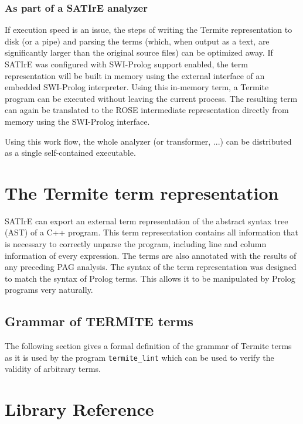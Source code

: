 \documentclass[10pt,twoside]{scrreprt}
\begin{document}
\subsection{As part of a SATIrE analyzer}

If execution speed is an issue, the steps of writing the Termite
representation to disk (or a pipe) and parsing the terms (which, when
output as a text, are significantly larger than the original source
files) can be optimized away. If SATIrE was configured with SWI-Prolog
support enabled, the term representation will be built in memory using
the external interface of an embedded SWI-Prolog interpreter. Using
this in-memory term, a Termite program can be executed without leaving
the current process. The resulting term can again be translated to the
ROSE intermediate representation directly from memory using the
SWI-Prolog interface.

Using this work flow, the whole analyzer (or transformer, ...) can be
distributed as a single self-contained executable.

\chapter{The Termite  term representation}

SATIrE can export an external term representation of the abstract
syntax tree (AST) of a C++ program. This term representation contains
all information that is necessary to correctly unparse the program,
including line and column information of every expression. The terms
are also annotated with the results of any preceding PAG analysis. The
syntax of the term representation was designed to match the syntax of
Prolog terms. This allows it to be manipulated by Prolog programs very
naturally.

\section{Grammar of TERMITE terms}

The following section gives a formal definition of the grammar of
Termite terms as it is used by the program \verb|termite_lint|
which can be used to verify the validity of arbitrary terms.


\chapter{Library Reference}


\printindex
\end{document}
